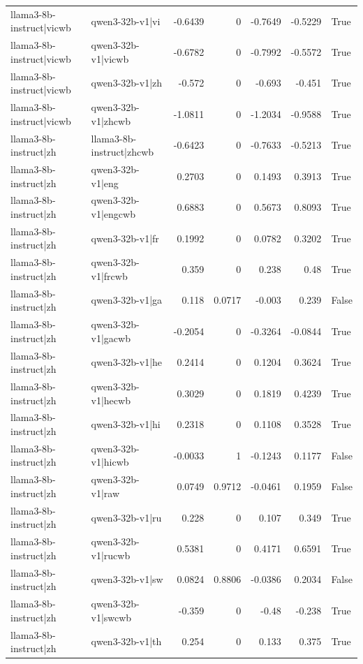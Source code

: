 \begin{table}
\begin{tabular}{l l r r r r l}
llama3-8b-instruct|vicwb & qwen3-32b-v1|vi & -0.6439 & 0 & -0.7649 & -0.5229 & True \\
llama3-8b-instruct|vicwb & qwen3-32b-v1|vicwb & -0.6782 & 0 & -0.7992 & -0.5572 & True \\
llama3-8b-instruct|vicwb & qwen3-32b-v1|zh & -0.572 & 0 & -0.693 & -0.451 & True \\
llama3-8b-instruct|vicwb & qwen3-32b-v1|zhcwb & -1.0811 & 0 & -1.2034 & -0.9588 & True \\
llama3-8b-instruct|zh & llama3-8b-instruct|zhcwb & -0.6423 & 0 & -0.7633 & -0.5213 & True \\
llama3-8b-instruct|zh & qwen3-32b-v1|eng & 0.2703 & 0 & 0.1493 & 0.3913 & True \\
llama3-8b-instruct|zh & qwen3-32b-v1|engcwb & 0.6883 & 0 & 0.5673 & 0.8093 & True \\
llama3-8b-instruct|zh & qwen3-32b-v1|fr & 0.1992 & 0 & 0.0782 & 0.3202 & True \\
llama3-8b-instruct|zh & qwen3-32b-v1|frcwb & 0.359 & 0 & 0.238 & 0.48 & True \\
llama3-8b-instruct|zh & qwen3-32b-v1|ga & 0.118 & 0.0717 & -0.003 & 0.239 & False \\
llama3-8b-instruct|zh & qwen3-32b-v1|gacwb & -0.2054 & 0 & -0.3264 & -0.0844 & True \\
llama3-8b-instruct|zh & qwen3-32b-v1|he & 0.2414 & 0 & 0.1204 & 0.3624 & True \\
llama3-8b-instruct|zh & qwen3-32b-v1|hecwb & 0.3029 & 0 & 0.1819 & 0.4239 & True \\
llama3-8b-instruct|zh & qwen3-32b-v1|hi & 0.2318 & 0 & 0.1108 & 0.3528 & True \\
llama3-8b-instruct|zh & qwen3-32b-v1|hicwb & -0.0033 & 1 & -0.1243 & 0.1177 & False \\
llama3-8b-instruct|zh & qwen3-32b-v1|raw & 0.0749 & 0.9712 & -0.0461 & 0.1959 & False \\
llama3-8b-instruct|zh & qwen3-32b-v1|ru & 0.228 & 0 & 0.107 & 0.349 & True \\
llama3-8b-instruct|zh & qwen3-32b-v1|rucwb & 0.5381 & 0 & 0.4171 & 0.6591 & True \\
llama3-8b-instruct|zh & qwen3-32b-v1|sw & 0.0824 & 0.8806 & -0.0386 & 0.2034 & False \\
llama3-8b-instruct|zh & qwen3-32b-v1|swcwb & -0.359 & 0 & -0.48 & -0.238 & True \\
llama3-8b-instruct|zh & qwen3-32b-v1|th & 0.254 & 0 & 0.133 & 0.375 & True \\

\end{tabular}
\end{table}
